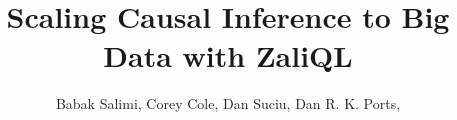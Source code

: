 
\title{Scaling Causal Inference to Big Data with ZaliQL}


\author{
    Babak Salimi,
    Corey Cole,
    Dan Suciu,
    Dan R. K. Ports,
}

